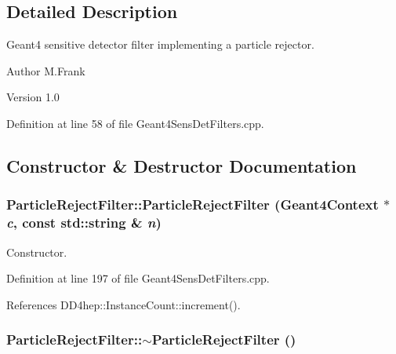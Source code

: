 \subsection{Detailed Description}
Geant4 sensitive detector filter implementing a particle rejector. \begin{DoxyAuthor}{Author}
M.Frank 
\end{DoxyAuthor}
\begin{DoxyVersion}{Version}
1.0 
\end{DoxyVersion}


Definition at line 58 of file Geant4SensDetFilters.cpp.

\subsection{Constructor \& Destructor Documentation}
\hypertarget{struct_d_d4hep_1_1_simulation_1_1_particle_reject_filter_aa06fb54a0ef772c1de13df2c32942adb}{
\subsubsection[{ParticleRejectFilter}]{\setlength{\rightskip}{0pt plus 5cm}ParticleRejectFilter::ParticleRejectFilter ({\bf Geant4Context} $\ast$ {\em c}, \/  const std::string \& {\em n})}}
\label{struct_d_d4hep_1_1_simulation_1_1_particle_reject_filter_aa06fb54a0ef772c1de13df2c32942adb}


Constructor. 

Definition at line 197 of file Geant4SensDetFilters.cpp.

References DD4hep::InstanceCount::increment().\hypertarget{struct_d_d4hep_1_1_simulation_1_1_particle_reject_filter_a3e870813c0699826fd9e01deab351ba8}{
\subsubsection[{$\sim$ParticleRejectFilter}]{\setlength{\rightskip}{0pt plus 5cm}ParticleRejectFilter::$\sim$ParticleRejectFilter ()}}
\label{struct_d_d4hep_1_1_simulation_1_1_particle_reject_filter_a3e870813c0699826fd9e01deab351ba8}


